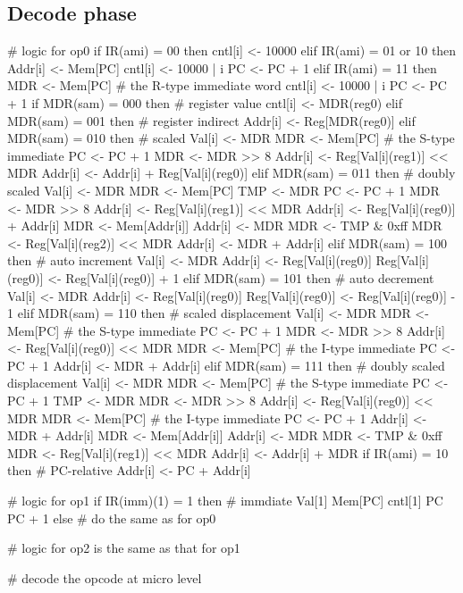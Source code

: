 \documentclass[12pt]{article}
\begin{document}
\subsection{Decode phase}
\begin{verbatimtab}
# logic for op0
if IR(ami) = 00 then
	cntl[i] <- 10000
elif IR(ami) = 01 or 10 then
	Addr[i] <- Mem[PC]
	cntl[i] <- 10000 | i
	PC <- PC + 1
elif IR(ami) = 11 then
	MDR <- Mem[PC] # the R-type immediate word
	cntl[i] <- 10000 | i
	PC <- PC + 1
	if MDR(sam) = 000 then # register value
		cntl[i] <- MDR(reg0)
	elif MDR(sam) = 001 then # register indirect
		Addr[i] <- Reg[MDR(reg0)]
	elif MDR(sam) = 010 then # scaled
		Val[i] <- MDR
		MDR <- Mem[PC] # the S-type immediate
		PC <- PC + 1
		MDR <- MDR >> 8
		Addr[i] <- Reg[Val[i](reg1)] << MDR
		Addr[i] <- Addr[i] + Reg[Val[i](reg0)]
	elif MDR(sam) = 011 then # doubly scaled
                Val[i] <- MDR
                MDR <- Mem[PC]
                TMP <- MDR
                PC <- PC + 1
                MDR <- MDR >> 8
                Addr[i] <- Reg[Val[i](reg1)] << MDR
                Addr[i] <- Reg[Val[i](reg0)] + Addr[i]
                MDR <- Mem[Addr[i]]
                Addr[i] <- MDR
                MDR <- TMP & 0xff
                MDR <- Reg[Val[i](reg2)] << MDR
                Addr[i] <- MDR + Addr[i]
	elif MDR(sam) = 100 then # auto increment
		Val[i] <- MDR
		Addr[i] <- Reg[Val[i](reg0)]
		Reg[Val[i](reg0)] <- Reg[Val[i](reg0)] + 1
	elif MDR(sam) = 101 then # auto decrement
		Val[i] <- MDR
		Addr[i] <- Reg[Val[i](reg0)]
		Reg[Val[i](reg0)] <- Reg[Val[i](reg0)] - 1
	elif MDR(sam) = 110 then # scaled displacement
		Val[i] <- MDR
		MDR <- Mem[PC] # the S-type immediate
		PC <- PC + 1
		MDR <- MDR >> 8
		Addr[i] <- Reg[Val[i](reg0)] << MDR
		MDR <- Mem[PC] # the I-type immediate
		PC <- PC + 1
		Addr[i] <- MDR + Addr[i]
	elif MDR(sam) = 111 then # doubly scaled displacement
		Val[i] <- MDR
		MDR <- Mem[PC] # the S-type immediate
		PC <- PC + 1
		TMP <- MDR
		MDR <- MDR >> 8
		Addr[i] <- Reg[Val[i](reg0)] << MDR
		MDR <- Mem[PC] # the I-type immediate
		PC <- PC + 1
		Addr[i] <- MDR + Addr[i]
		MDR <- Mem[Addr[i]]
		Addr[i] <- MDR
		MDR <- TMP & 0xff
		MDR <- Reg[Val[i](reg1)] << MDR
		Addr[i] <- Addr[i] + MDR
if IR(ami) = 10 then # PC-relative
	Addr[i] <- PC + Addr[i]

# logic for op1
if IR(imm)(1) = 1 then # immdiate
	Val[1] \get Mem[PC]
	cntl[1] 
	PC \get PC + 1
else
	# do the same as for op0

# logic for op2 is the same as that for op1

# decode the opcode at micro level
\end{verbatimtab}
\end{document}
